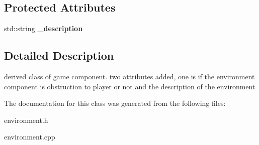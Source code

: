 \subsection*{Protected Attributes}
\begin{DoxyCompactItemize}
\item 
\hypertarget{class_environment_ab34a6cfaa80a2799a23916b7cab95cb5}{}\label{class_environment_ab34a6cfaa80a2799a23916b7cab95cb5} 
std\+::string {\bfseries \+\_\+description}
\end{DoxyCompactItemize}


\subsection{Detailed Description}
derived class of game component. two attributes added, one is if the environment component is obstruction to player or not and the description of the environment 

The documentation for this class was generated from the following files\+:\begin{DoxyCompactItemize}
\item 
environment.\+h\item 
environment.\+cpp\end{DoxyCompactItemize}
